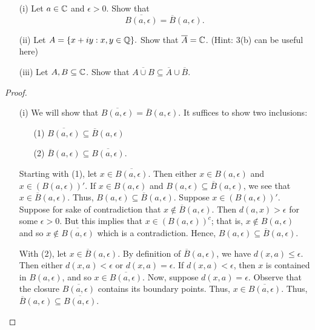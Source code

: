 \documentclass[a4paper]{article}
\begin{document}
\begin{problem}
    \begin{enumerate}
        \item[(i)] Let \( a \in \mathbb{C}  \) and \( \epsilon > 0  \). Show that 
            \[  \overline{B(a,\epsilon)} = \overline{B}(a,\epsilon). \]
        \item[(ii)] Let \( A = \{ x + iy : x,y \in \mathbb{Q}  \}. \)
            Show that \( \overline{A} = \mathbb{C}  \). (Hint: 3(b) can be useful here)
        \item[(iii)] Let \( A,B \subseteq \mathbb{C}  \). Show that \( \overline{A \cup B} \subseteq  \overline{A} \cup \overline{B} \).
    \end{enumerate}
\end{problem}
\begin{proof}
\begin{enumerate}
    \item[(i)] We will show that \( \overline{B(a,\epsilon)} = \overline{B}(a,\epsilon) \). It suffices to show two inclusions:
        \begin{enumerate}
            \item[(1)] \( \overline{B(a,\epsilon)} \subseteq  \overline{B}(a,\epsilon) \)
            \item[(2)] \( \overline{B}(a,\epsilon) \subseteq  \overline{B(a,\epsilon)} \).
        \end{enumerate}
    Starting with (1), let \( x \in \overline{B(a,\epsilon)} \). Then either \( x \in B(a,\epsilon) \) and \( x \in (B(a,\epsilon))' \). If \( x \in B(a,\epsilon) \) and \( B(a,\epsilon) \subseteq  \overline{B}(a,\epsilon) \), we see that \( x \in \overline{B}(a,\epsilon) \). Thus, \( B(a,\epsilon) \subseteq  \overline{B}(a,\epsilon) \). Suppose \( x \in (B(a,\epsilon))' \). Suppose for sake of contradiction that \( x \notin \overline{B}(a,\epsilon) \). Then \( d(a,x) > \epsilon  \) for some \( \epsilon > 0  \). But this implies that \( x \in (B(a,\epsilon))^{c} \); that is, \( x \notin B(a,\epsilon) \) and so \( x \notin \overline{B(a,\epsilon)} \) which is a contradiction. Hence, \( B(a,\epsilon) \subseteq  \overline{B}(a,\epsilon) \).
    
    With (2), let \( x \in \overline{B}(a,\epsilon) \). By definition of \( \overline{B}(a,\epsilon) \), we have \( d(x,a) \leq \epsilon \). Then either \( d(x,a) < \epsilon \) or \( d(x,a) = \epsilon \). If \( d(x,a) < \epsilon  \), then \( x  \) is contained in \( B(a,\epsilon) \), and so \( x \in \overline{B(a,\epsilon)} \). Now, suppose \( d(x,a) = \epsilon \). Observe that the closure \( \overline{B(a,\epsilon)} \) contains its boundary points. Thus, \( x \in \overline{B(a,\epsilon)} \). Thus, \( \overline{B}(a,\epsilon) \subseteq  \overline{B(a,\epsilon)} \). 


\end{enumerate}
\end{proof}
\end{document}
